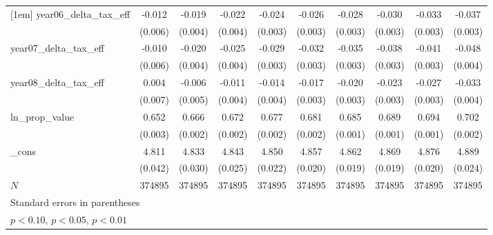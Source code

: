 {\begin{tabular}{l*{9}{c}}
[1em]
year06\_delta\_tax\_eff&      -0.012\sym{**} &      -0.019\sym{***}&      -0.022\sym{***}&      -0.024\sym{***}&      -0.026\sym{***}&      -0.028\sym{***}&      -0.030\sym{***}&      -0.033\sym{***}&      -0.037\sym{***}\\
            &     (0.006)         &     (0.004)         &     (0.004)         &     (0.003)         &     (0.003)         &     (0.003)         &     (0.003)         &     (0.003)         &     (0.003)         \\
[1em]
year07\_delta\_tax\_eff&      -0.010\sym{*}  &      -0.020\sym{***}&      -0.025\sym{***}&      -0.029\sym{***}&      -0.032\sym{***}&      -0.035\sym{***}&      -0.038\sym{***}&      -0.041\sym{***}&      -0.048\sym{***}\\
            &     (0.006)         &     (0.004)         &     (0.004)         &     (0.003)         &     (0.003)         &     (0.003)         &     (0.003)         &     (0.003)         &     (0.004)         \\
[1em]
year08\_delta\_tax\_eff&       0.004         &      -0.006         &      -0.011\sym{**} &      -0.014\sym{***}&      -0.017\sym{***}&      -0.020\sym{***}&      -0.023\sym{***}&      -0.027\sym{***}&      -0.033\sym{***}\\
            &     (0.007)         &     (0.005)         &     (0.004)         &     (0.004)         &     (0.003)         &     (0.003)         &     (0.003)         &     (0.003)         &     (0.004)         \\
[1em]
ln\_prop\_value&       0.652\sym{***}&       0.666\sym{***}&       0.672\sym{***}&       0.677\sym{***}&       0.681\sym{***}&       0.685\sym{***}&       0.689\sym{***}&       0.694\sym{***}&       0.702\sym{***}\\
            &     (0.003)         &     (0.002)         &     (0.002)         &     (0.002)         &     (0.002)         &     (0.001)         &     (0.001)         &     (0.001)         &     (0.002)         \\
[1em]
\_cons      &       4.811\sym{***}&       4.833\sym{***}&       4.843\sym{***}&       4.850\sym{***}&       4.857\sym{***}&       4.862\sym{***}&       4.869\sym{***}&       4.876\sym{***}&       4.889\sym{***}\\
            &     (0.042)         &     (0.030)         &     (0.025)         &     (0.022)         &     (0.020)         &     (0.019)         &     (0.019)         &     (0.020)         &     (0.024)         \\
\hline
\(N\)       &      374895         &      374895         &      374895         &      374895         &      374895         &      374895         &      374895         &      374895         &      374895         \\
\hline\hline
\multicolumn{10}{l}{\footnotesize Standard errors in parentheses}\\
\multicolumn{10}{l}{\footnotesize \sym{*} \(p<0.10\), \sym{**} \(p<0.05\), \sym{***} \(p<0.01\)}\\
\end{tabular}
}
